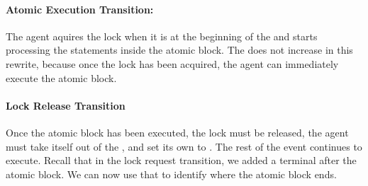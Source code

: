 \paragraph{Atomic Execution Transition:} The agent aquires the lock when it is at the beginning of the  and starts processing the statements inside the atomic block. The  does not increase in this rewrite, because once the lock has been acquired, the agent can immediately execute the atomic block. 

\paragraph{Lock Release Transition}
Once the atomic block has been executed, the lock must be released, the agent must take itself out of the , and set its own  to . The rest of the event continues to execute. Recall that in the lock request transition, we added a terminal  after the atomic block. We can now use that to identify where the atomic block ends. 

